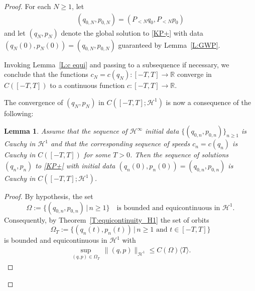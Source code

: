 \documentclass{amsart}
\newcommand{\R}{{\mathbb{R}}}
\newtheorem{lemma}[theorem]{Lemma}
\theoremstyle{definition}
\numberwithin{equation}{section}
\renewcommand{\H}{\mathcal H}
\newcommand{\la}{\langle}
\newcommand{\ra}{\rangle}
\begin{document}
\begin{proof}
For each $N\geq 1$, let
\begin{align*}
(q_{0,N}, p_{0,N}) = (P_{<N} q_0, P_{<N} p_0)
\end{align*}
and let $(q_N, p_N)$ denote the global solution to \eqref{KP+} with data $(q_N(0), p_N(0))=(q_{0,N}, p_{0,N})$ guaranteed by Lemma~\ref{L:GWP}.

Invoking Lemma~\ref{L:c equi} and passing to a subsequence if necessary, we conclude that the functions $c_N=c(q_N):[-T,T]\to \R$ converge in $C([-T,T])$ to a continuous function $c:[-T,T]\to\R$.

The convergence of $(q_N,p_N)$ in $C([-T,T]; \H^1)$  is now a consequence of the following: 

\begin{lemma}\label{L:Cauchy}
Assume that the sequence of $\H^\infty$ initial data $\{(q_{0,n}, p_{0,n})\}_{n\geq 1}$ is Cauchy in $\H^1$ and that the corresponding sequence of speeds $c_n=c(q_n)$ is Cauchy in $C([-T,T])$ for some $T>0$.  Then the sequence of solutions $(q_n, p_n)$ to \eqref{KP+} with initial data $(q_n(0), p_n(0))= (q_{0,n}, p_{0,n})$ is Cauchy in $C([-T,T];\H^1)$.
\end{lemma}

\begin{proof}
By hypothesis, the set 
$$
 \Omega:=\bigl\{(q_{0,n}, p_{0,n}) \,|\, n\geq 1\bigr\} \quad \text{is bounded and equicontinuous in $\H^1$.}
$$
Consequently, by Theorem~\ref{T:equicontinuity_H1} the set of orbits
$$
\Omega_T:=\bigl\{ (q_n(t), p_n(t))\,|\, n\geq 1 \text{ and } t\in [-T,T]\bigr\}
$$
is bounded and equicontinuous in $\H^1$ with
\begin{align}\label{1131}
\sup_{(q,p)\in \Omega_T}\, \|(q,p)\|_{\H^1} \leq C(\Omega)\la T\ra.
\end{align}


\end{proof}
\end{proof}
\end{document}
